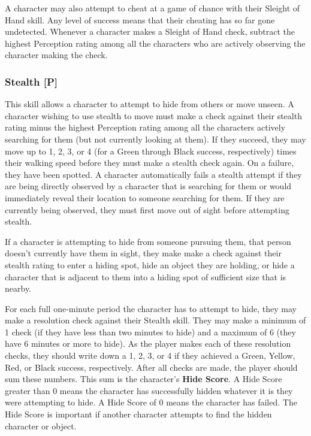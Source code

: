 \documentclass[oneside]{book}
\begin{document}
\begin{multicols}{2}
A character may also attempt to cheat at a game of chance with their Sleight of Hand skill. Any level of success means that their cheating has so far gone undetected. 
Whenever a character makes a Sleight of Hand check, subtract the highest Perception rating among all the characters who are actively observing the character making the check. 

\subsubsection{Stealth [P]}
This skill allows a character to attempt to hide from others or move unseen. A character wishing to use stealth to move must make a check against their stealth rating minus the highest Perception rating among all the characters actively searching for them (but not currently looking at them). If they succeed, they may move up to 1, 2, 3, or 4 (for a Green through Black success, respectively) times their walking speed before they must make a stealth check again. On a failure, they have been spotted. A character automatically fails a stealth attempt if they are being directly observed by a character that is searching for them or would immediately reveal their location to someone searching for them. If they are currently being observed, they must first move out of sight before attempting stealth. 

If a character is attempting to hide from someone pursuing them, that person doesn't currently have them in sight, they make make a check against their stealth rating to enter a hiding spot, hide an object they are holding, or hide a character that is adjacent to them into a hiding spot of sufficient size that is nearby.

 For each full one-minute period the character has to attempt to hide, they may make a resolution check against their Stealth skill. They may make a minimum of 1 check (if they have less than two minutes to hide) and a maximum of 6 (they have 6 minutes or more to hide). As the player makes each of these resolution checks, they should write down a 1, 2, 3, or 4 if they achieved a Green, Yellow, Red, or Black success, respectively. After all checks are made, the player should sum these numbers. This sum is the character's \textbf{Hide Score}. A Hide Score greater than 0 means the character has successfully hidden whatever it is they were attempting to hide. A Hide Score of 0 means the character has failed. The Hide Score is important if another character attempts to find the hidden character or object.


\end{multicols}
\end{document}
